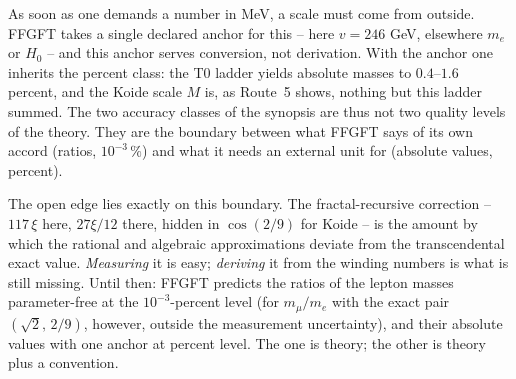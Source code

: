 As soon as one demands a number in MeV, a scale must come from outside. FFGFT
takes a single declared anchor for this -- here $v = 246$ GeV, elsewhere $m_e$
or $H_0$ -- and this anchor serves conversion, not derivation. With the anchor
one inherits the percent class: the T0 ladder yields absolute masses to
$0{.}4$--$1{.}6$ percent, and the Koide scale $M$ is, as Route~5 shows, nothing
but this ladder summed. The two accuracy classes of the synopsis are thus not
two quality levels of the theory. They are the boundary between what FFGFT says
of its own accord (ratios, $10^{-3}\,\%$) and what it needs an external unit
for (absolute values, percent).

The open edge lies exactly on this boundary. The fractal-recursive correction --
$117\,\xi$ here, $27\xi/12$ there, hidden in $\cos(2/9)$ for Koide -- is the
amount by which the rational and algebraic approximations deviate from the
transcendental exact value. \emph{Measuring} it is easy; \emph{deriving} it from
the winding numbers is what is still missing. Until then: FFGFT predicts the
ratios of the lepton masses parameter-free at the $10^{-3}$-percent level (for
$m_\mu/m_e$ with the exact pair $(\sqrt2,\,2/9)$, however, outside the
measurement uncertainty), and their
absolute values with one anchor at percent level. The one is theory; the other
is theory plus a convention.
